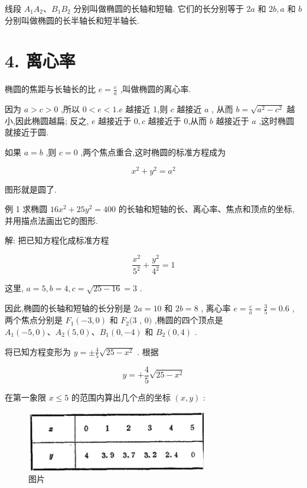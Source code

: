 \documentclass[lang=cn,newtx,10pt,scheme=chinese]{elegantbook}
\begin{document}
线段 \({A}_{1}{A}_{2}\text{、}{B}_{1}{B}_{2}\) 分别叫做椭圆的长轴和短轴. 它们的长分别等于 \({2a}\) 和 \({2b},a\) 和 \(b\) 分别叫做椭圆的长半轴长和短半轴长.

\section*{4. 离心率}

椭圆的焦距与长轴长的比 \(e = \frac{c}{a}\) ,叫做椭圆的离心率.

因为 \(a > c > 0\) ,所以 \(0 < e < 1.e\) 越接近 1,则 \(c\) 越接近 \(a\) , 从而 \(b = \sqrt{{a}^{2} - {c}^{2}}\) 越小,因此椭圆越扁; 反之, \(e\) 越接近于 \(0,c\) 越接近于 0,从而 \(b\) 越接近于 \(a\) ,这时椭圆就接近于圆.

如果 \(a = b\) ,则 \(c = 0\) ,两个焦点重合,这时椭圆的标准方程成为

\[
    {x}^{2} + {y}^{2} = {a}^{2}
\]

图形就是圆了.

例 1 求椭圆 \({16}{x}^{2} + {25}{y}^{2} = {400}\) 的长轴和短轴的长、离心率、焦点和顶点的坐标, 并用描点法画出它的图形.

解: 把已知方程化成标准方程

\[
  \frac{{x}^{2}}{{5}^{2}} + \frac{{y}^{2}}{{4}^{2}} = 1
\]

这里, \(a = 5,b = 4,c = \sqrt{{25} - {16}} = 3\) .

因此,椭圆的长轴和短轴的长分别是 \({2a} = {10}\) 和 \({2b} = 8\) , 离心率 \(e = \frac{c}{a} = \frac{3}{5} = {0.6}\) ,两个焦点分别是 \({F}_{1}\left( {-3,0}\right)\) 和 \({F}_{2}(3\) , \(0)\) ,椭圆的四个顶点是 \({A}_{1}\left( {-5,0}\right) \text{、}{A}_{2}\left( {5,0}\right) \text{、}{B}_{1}\left( {0, - 4}\right)\) 和 \({B}_{2}\left( {0,4}\right)\) .

将已知方程变形为 \(y = \pm \frac{4}{5}\sqrt{{25} - {x}^{2}}\) . 根据

\[
  y = + \frac{4}{5}\sqrt{{25} - {x}^{2}}
\]

在第一象限 \(x \leq 5\) 的范围内算出几个点的坐标 \(\left( {x,y}\right)\) :

\begin{figure}[h]
  \centering
  \includegraphics[max width=0.7\textwidth]{images/01912cc2-ffb6-728e-9ae7-b113ff05c64b_92_362735.jpg}
  \caption{图片}
\end{figure}
\end{document}
